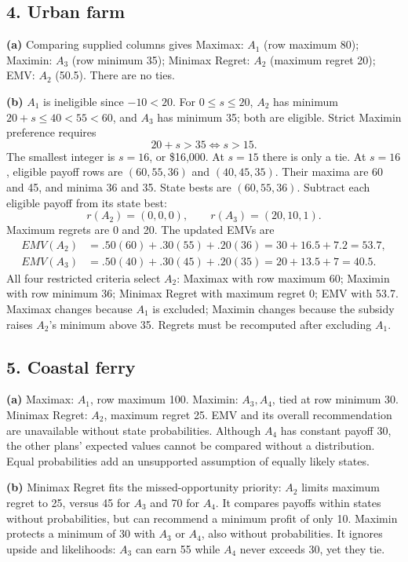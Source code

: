 \subsection*{4. Urban farm}
\textbf{(a)} Comparing supplied columns gives Maximax: $A_1$ (row maximum 80); Maximin: $A_3$ (row minimum 35); Minimax Regret: $A_2$ (maximum regret 20); EMV: $A_2$ (50.5). There are no ties.

\textbf{(b)} $A_1$ is ineligible since $-10<20$. For $0\leq s\leq20$, $A_2$ has minimum $20+s\leq40<55<60$, and $A_3$ has minimum 35; both are eligible. Strict Maximin preference requires
\[
20+s>35\iff s>15.
\]
The smallest integer is $s=16$, or \$16,000. At $s=15$ there is only a tie. At $s=16$, eligible payoff rows are $(60,55,36)$ and $(40,45,35)$. Their maxima are 60 and 45, and minima 36 and 35. State bests are $(60,55,36)$. Subtract each eligible payoff from its state best:
\[
r(A_2)=(0,0,0),\qquad r(A_3)=(20,10,1).
\]
Maximum regrets are 0 and 20. The updated EMVs are
\begin{align*}
EMV(A_2)&=.50(60)+.30(55)+.20(36)=30+16.5+7.2=53.7,\\
EMV(A_3)&=.50(40)+.30(45)+.20(35)=20+13.5+7=40.5.
\end{align*}
All four restricted criteria select $A_2$: Maximax with row maximum 60; Maximin with row minimum 36; Minimax Regret with maximum regret 0; EMV with 53.7. Maximax changes because $A_1$ is excluded; Maximin changes because the subsidy raises $A_2$'s minimum above 35. Regrets must be recomputed after excluding $A_1$.

\subsection*{5. Coastal ferry}
\textbf{(a)} Maximax: $A_1$, row maximum 100. Maximin: $A_3,A_4$, tied at row minimum 30. Minimax Regret: $A_2$, maximum regret 25. EMV and its overall recommendation are unavailable without state probabilities. Although $A_4$ has constant payoff 30, the other plans' expected values cannot be compared without a distribution. Equal probabilities add an unsupported assumption of equally likely states.

\textbf{(b)} Minimax Regret fits the missed-opportunity priority: $A_2$ limits maximum regret to 25, versus 45 for $A_3$ and 70 for $A_4$. It compares payoffs within states without probabilities, but can recommend a minimum profit of only 10. Maximin protects a minimum of 30 with $A_3$ or $A_4$, also without probabilities. It ignores upside and likelihoods: $A_3$ can earn 55 while $A_4$ never exceeds 30, yet they tie.

